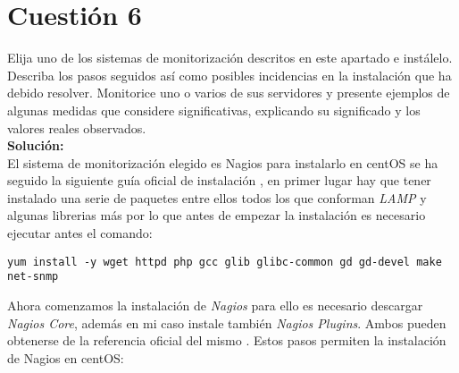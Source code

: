 \documentclass[a4paper, 10pt]{article} %
\begin{document}
\section{Cuestión 6}
Elija uno de los sistemas de monitorización descritos en este apartado e instálelo. Describa los pasos seguidos así como posibles incidencias en la instalación que ha debido resolver. Monitorice uno o varios de sus servidores y presente ejemplos de algunas medidas que considere significativas, explicando su significado y los valores reales observados.\\
\textbf{Solución:}\\
El sistema de monitorización elegido es Nagios para instalarlo en centOS se ha seguido la siguiente guía oficial de instalación \cite{4}, en primer lugar hay que tener instalado una serie de paquetes entre ellos todos los que conforman \textit{LAMP} y algunas librerias más por lo que antes de empezar la instalación es necesario ejecutar antes el comando:
\begin{verbatim}
yum install -y wget httpd php gcc glib glibc-common gd gd-devel make net-snmp
\end{verbatim}
Ahora comenzamos la instalación de \textit{Nagios} para ello es necesario descargar \textit{Nagios Core}, además en mi caso instale también \textit{Nagios Plugins}. Ambos pueden obtenerse de la referencia oficial del mismo \cite{10}.
Estos pasos permiten la instalación de Nagios en centOS:
\end{document}
